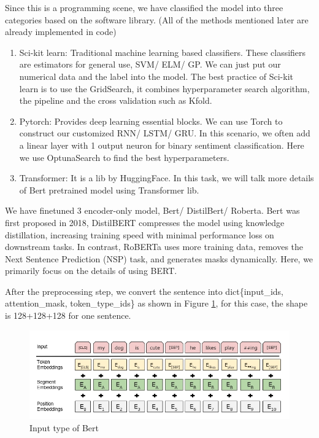 \documentclass{article}
\begin{document}
Since this is a programming scene, we have classified the model into three categories based on the software library. (All of the methods mentioned later are already implemented in code)
\begin{enumerate}
    \item Sci-kit learn: Traditional machine learning based classifiers. These classifiers are estimators for general use, SVM/ ELM/ GP. We can just put our numerical data and the label into the model. The best practice of Sci-kit learn is to use the GridSearch, it combines hyperparameter search algorithm, the pipeline and the cross validation such as Kfold.
    \item Pytorch: Provides deep learning essential blocks. We can use Torch to construct our customized RNN/ LSTM/ GRU. In this scenario, we often add a linear layer with 1 output neuron for binary sentiment classification. Here we use OptunaSearch to find the best hyperparameters.
    \item Transformer: It is a lib by HuggingFace. In this task, we will talk more details of Bert pretrained model using Transformer lib.
\end{enumerate}

We have finetuned 3 encoder-only model, Bert/ DistilBert/ Roberta. Bert was first proposed in 2018, DistilBERT compresses the model using knowledge distillation, increasing training speed with minimal performance loss on downstream tasks. In contrast, RoBERTa uses more training data, removes the Next Sentence Prediction (NSP) task, and generates masks dynamically. \hypertarget{hpc}{{}}Here, we primarily focus on the details of using BERT.

After the preprocessing step, we convert the sentence into dict\{input\_ids, attention\_mask, token\_type\_ids\} as shown in Figure \ref{fig:input}, for this case, the shape is 128+128+128 for one sentence.

\begin{figure}
    \centering
    \includegraphics[width=1.0\linewidth]{bert_input.png}
    \caption{Input type of Bert}
    \label{fig:input}
\end{figure}
\end{document}
